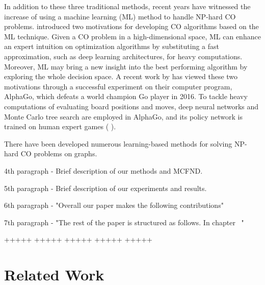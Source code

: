 In addition to these three traditional methods, recent years have witnessed the increase of using a machine learning (ML) method to handle NP-hard CO problems. \citeauthor{bengio2018machine} \cite{bengio2018machine} introduced two motivations for developing CO algorithms based on the ML technique. Given a CO problem in a high-dimensional space, ML can enhance an expert intuition on optimization algorithms by substituting a fast approximation, such as deep learning architectures, for heavy computations. Moreover, ML may bring a new insight into the best performing algorithm by exploring the whole decision space. A recent work by \citeauthor{silver2017mastering} \cite{silver2017mastering} has viewed these two motivations through a successful experiment on their computer program, AlphaGo, which defeats a world champion Go player in 2016. To tackle heavy computations of evaluating board positions and moves, deep neural networks and Monte Carlo tree search are employed in AlphaGo, and its policy network is trained on human expert games (\citeauthor{silver2016mastering} \cite{silver2016mastering}).

There have been developed numerous learning-based methods for solving NP-hard CO problems on graphs.

4th paragraph - Brief description of our methods and MCFND.

5th paragraph - Brief description of our experiments and results.

6th paragraph - "Overall our paper makes the following contributions"

7th paragraph - "The rest of the paper is structured as follows. In chapter ~"

+++++ +++++ +++++ +++++ +++++





\chapter{Related Work}
